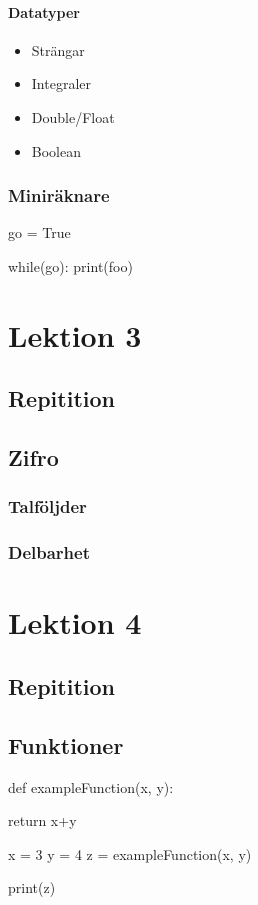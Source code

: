 \documentclass{article}%
\begin{document}
\paragraph{Datatyper}
\begin{itemize}
\item Strängar
\item Integraler
\item Double/Float
\item Boolean
\end{itemize}
\subsubsection{Miniräknare}

\begin{python}[language=Python, caption=while-loop]
go = True

while(go):
    print(foo) 
\end{python}


\section{Lektion 3}
\subsection{Repitition}

\subsection{Zifro}
\subsubsection{Talföljder}
\subsubsection{Delbarhet}



\section{Lektion 4}

\subsection{Repitition}
\subsection{Funktioner}
\begin{python}[language=Python, caption=Funktioner]
def exampleFunction(x, y):
 
    return x+y

x = 3
y = 4
z = exampleFunction(x, y)

print(z)
\end{python}
\end{document}
